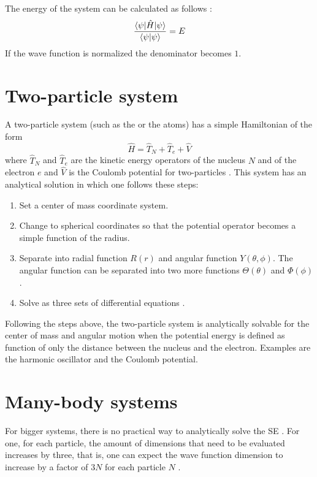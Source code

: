 \documentclass[../master_thesis.tex]{subfiles}
\begin{document}
The energy of the system can be calculated as follows \cite{Cramer:2004}:
\begin{equation}\label{eq:endevaleq}
  \frac{\braket{\psi|\hat{H}|\psi}}{\braket{\psi|\psi}} = E
\end{equation}
If the wave function is normalized the denominator becomes $1$.

\section{Two-particle system}
A two-particle system (such as the  or the  atoms) has a simple
Hamiltonian of the form
\begin{equation}
  \hat{H}=\hat{T}_{N}+\hat{T}_{e}+\hat{V}
\end{equation}
where $\hat{T}_N$ and $\hat{T}_e$ are the kinetic energy operators of the nucleus $N$ and
of the electron $e$ and $\hat{V}$ is the Coulomb potential for two-particles
\cite{Atkins:2014, Jensen:2017}.
This system has an analytical solution in which one follows these steps:
\begin{enumerate}
  \item Set a center of mass coordinate system.
  \item Change to spherical coordinates so that the potential operator becomes a
  simple function of the radius.
  \item Separate into radial function $R(r)$ and angular function
  $Y(\theta, \phi)$. The angular function can be separated into two more
  functions $\Theta(\theta)$ and $\Phi(\phi)$.
  \item Solve as three sets of differential equations \cite{Simons:2016}.
\end{enumerate}
Following the steps above, the two-particle system is analytically solvable for
the center of mass and angular motion when
the potential energy is defined as function of only the distance between the
nucleus and the electron. Examples are the harmonic oscillator and the Coulomb potential.

\section{Many-body systems}

For bigger systems, there is no practical way to analytically solve the
\ac{SE} \cite{Jensen:2017}. For one, for each particle, the amount of dimensions that need to be
evaluated increases by three, that is, one can expect the wave function
dimension to increase by a factor of $3N$ for each particle $N$
\cite{Cramer:2004}.
\end{document}
